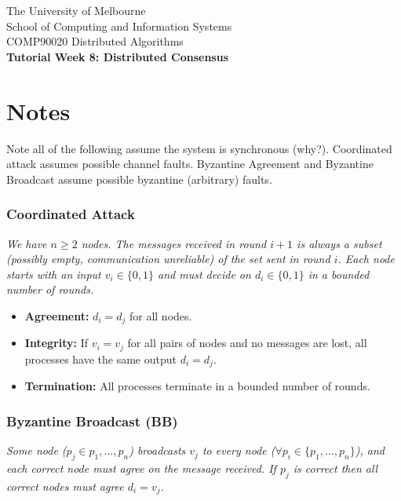 \documentclass[12pt]{article}
\begin{document}
\begin{center}
    {\sc The University of Melbourne
        \\
        School of Computing and Information Systems
        \\
    COMP90020 Distributed Algorithms}
    \bigskip \\
    {\Large\bf Tutorial Week 8: Distributed Consensus}
    \bigskip \\
\end{center}

\section*{Notes}

Note all of the following assume the system is synchronous (why?). Coordinated attack assumes possible channel faults. Byzantine Agreement and Byzantine Broadcast assume possible byzantine (arbitrary) faults.

\subsubsection*{Coordinated Attack}

\begin{center}
    \textit{We have $n \geq 2$ nodes. The messages received in round $i+1$ is always a subset (possibly empty, communication unreliable) of the set sent in round $i$. Each node starts with an input $v_i \in \{0,1\}$ and must decide on $d_i \in \{0,1\}$ in a bounded number of rounds.}
\end{center}

\begin{itemize}
    \item \textbf{Agreement: } $d_i = d_j$ for all nodes.
    \item \textbf{Integrity: } If $v_i = v_j$ for all pairs of nodes and no messages are lost, all processes have the same output $d_i = d_j$.
    \item \textbf{Termination: } All processes terminate in a bounded number of rounds.
\end{itemize}


\subsubsection*{Byzantine Broadcast (BB)}

\begin{center}
    \textit{Some node ($p_{j} \in {p_1, ..., p_n}$) broadcasts $v_j$ to every node ($\forall p_i \in \{p_1, ..., p_n\}$), and each correct node must agree on the message received. If $p_{j}$ is correct then all correct nodes must agree $d_i = v_j$.}
\end{center}
\end{document}
